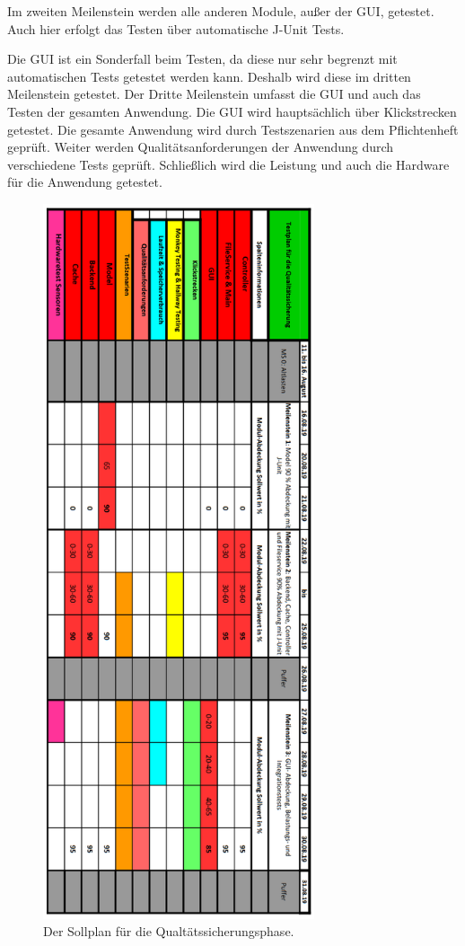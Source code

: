 \documentclass[parskip=full]{scrartcl}
\begin{document}
Im zweiten Meilenstein werden alle anderen Module, außer der GUI, getestet. Auch hier erfolgt das Testen über automatische J-Unit Tests.

Die GUI ist ein Sonderfall beim Testen, da diese nur sehr begrenzt mit automatischen Tests getestet werden kann. Deshalb wird diese im dritten Meilenstein getestet. Der Dritte Meilenstein umfasst die GUI und auch das Testen der gesamten Anwendung. Die GUI wird hauptsächlich über Klickstrecken getestet. Die gesamte Anwendung wird durch Testszenarien aus dem Pflichtenheft geprüft. Weiter werden Qualitätsanforderungen der Anwendung durch verschiedene Tests geprüft. Schließlich wird die Leistung und auch die Hardware für die Anwendung getestet. 

\begin{figure}[htbp]
	\begin{center}
		\includegraphics[width = 8cm]{Grafiken/sollplan.png}
		\caption{Der Sollplan für die Qualtätssicherungsphase.}
		\label{sollplan}
	\end{center}
\end{figure}
\end{document}
